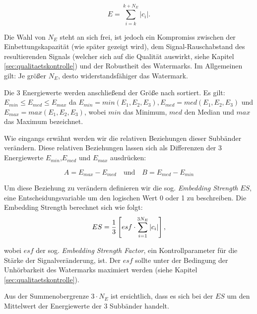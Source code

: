 	\begin{equation}
		E = \sum\limits_{i=k}^{k+{N}_{E}}|c_i|.
		\label{equ:energy}
	\end{equation}

Die Wahl von ${N}_{E}$ steht an sich frei, ist jedoch ein Kompromiss zwischen der Einbettungskapazität (wie später gezeigt wird), dem Signal-Rauschabstand des resultierenden Signals (welcher sich auf die Qualität auswirkt\cite{xiang2007robust}, siehe Kapitel \ref{sec:qualitaetskontrolle}) und der Robustheit des Watermarks. Im Allgemeinen gilt: Je größer ${N}_{E}$, desto widerstandsfähiger das Watermark.

Die 3 Energiewerte werden anschließend der Größe nach sortiert. Es gilt: ${E}_{min}\leq{E}_{med}\leq{E}_{max}$ da ${E}_{min}=min({E}_{1}, {E}_{2}, {E}_{3}), {E}_{med}=med({E}_{1}, {E}_{2}, {E}_{3})$ und ${E}_{max}=max({E}_{1}, {E}_{2}, {E}_{3})$, wobei $min$ das Minimum, $med$ den Median und $max$ das Maximum bezeichnet. 

Wie eingangs erwähnt werden wir die relativen Beziehungen dieser Subbänder verändern. Diese relativen Beziehungen lassen sich als Differenzen der 3 Energiewerte ${E}_{min}$,${E}_{med}$ und ${E}_{max}$ ausdrücken:

	 \begin{equation}
		 A = {E}_{max}-{E}_{med} \quad\mbox{und}\quad B = {E}_{med}-{E}_{min} \label{equ:energydifferences}
	 \end{equation}
	 
Um diese Beziehung zu verändern definieren wir die sog. \textit{Embedding Strength} $ES$, eine Entscheidungsvariable um den logischen Wert 0 oder 1 zu beschreiben. Die Embedding Strength berechnet sich wie folgt:
	\begin{equation}
		ES = {1 \over 3} \left[ esf \cdot \sum\limits_{i=1}^{3{N}_{E}}|c_i| \right],
		\label{equ:embeddingstrength}
	\end{equation}
	
wobei $esf$ der sog. \textit{Embedding Strength Factor}, ein Kontrollparameter für die Stärke der Signalveränderung, ist. Der $esf$ sollte unter der Bedingung der Unhörbarkeit des Watermarks maximiert werden (siehe Kapitel \ref{sec:qualitaetskontrolle}).
	 
Aus der Summenobergrenze $3 \cdot {N}_{E}$ ist ersichtlich, dass es sich bei der $ES$ um den Mittelwert der Energiewerte der 3 Subbänder handelt.

